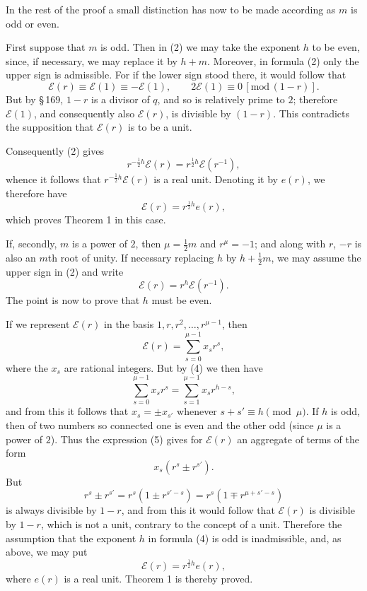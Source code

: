 \documentclass[11pt]{article}
\begin{document}
In the rest of the proof a small distinction has now to be made according as $m$ is odd or even.

First suppose that $m$ is odd. Then in (2) we may take the exponent $h$ to be even, since, if necessary, we may replace it by $h+m$. Moreover, in formula (2) only the upper sign is admissible. For if the lower sign stood there, it would follow that
\[
\mathscr E(r)\equiv\mathscr E(1)\equiv-\mathscr E(1),\qquad 2\mathscr E(1)\equiv0\,[\mathrm{mod}\,(1-r)].
\]
But by \S\,169, $1-r$ is a divisor of $q$, and so is relatively prime to $2$; therefore $\mathscr E(1)$, and consequently also $\mathscr E(r)$, is divisible by $(1-r)$. This contradicts the supposition that $\mathscr E(r)$ is to be a unit.

Consequently (2) gives
\[
r^{-\frac12 h}\mathscr E(r)=r^{\frac12 h}\mathscr E(r^{-1}),
\]
whence it follows that $r^{-\frac12 h}\mathscr E(r)$ is a real unit. Denoting it by $e(r)$, we therefore have
\begin{equation}
\mathscr E(r)=r^{\frac12 h}e(r),
\tag{3}
\end{equation}
which proves Theorem 1 in this case.

If, secondly, $m$ is a power of $2$, then $\mu=\frac12m$ and $r^\mu=-1$; and along with $r$, $-r$ is also an $m$th root of unity. If necessary replacing $h$ by $h+\frac12m$, we may assume the upper sign in (2) and write
\begin{equation}
\mathscr E(r)=r^h\mathscr E(r^{-1}).
\tag{4}
\end{equation}
The point is now to prove that $h$ must be even.

If we represent $\mathscr E(r)$ in the basis $1,r,r^2,\ldots,r^{\mu-1}$, then
\begin{equation}
\mathscr E(r)=\sum_{s=0}^{\mu-1}x_sr^s,
\tag{5}
\end{equation}
where the $x_s$ are rational integers. But by (4) we then have
\[
\sum_{s=0}^{\mu-1}x_sr^s=\sum_{s=1}^{\mu-1}x_sr^{h-s},
\]
and from this it follows that $x_s=\pm x_{s'}$ whenever $s+s'\equiv h\pmod\mu$. If $h$ is odd, then of two numbers so connected one is even and the other odd (since $\mu$ is a power of $2$). Thus the expression (5) gives for $\mathscr E(r)$ an aggregate of terms of the form
\[
x_s(r^s\pm r^{s'}).
\]
But
\[
r^s\pm r^{s'}=r^s(1\pm r^{s'-s})=r^s(1\mp r^{\mu+s'-s})
\]
is always divisible by $1-r$, and from this it would follow that $\mathscr E(r)$ is divisible by $1-r$, which is not a unit, contrary to the concept of a unit. Therefore the assumption that the exponent $h$ in formula (4) is odd is inadmissible, and, as above, we may put
\[
\mathscr E(r)=r^{\frac12h}e(r),
\]
where $e(r)$ is a real unit. Theorem 1 is thereby proved.
\end{document}

